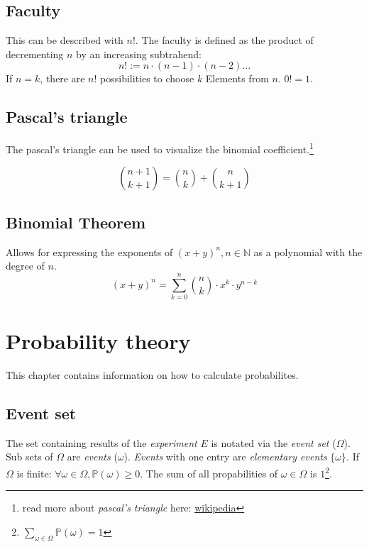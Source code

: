 \documentclass[twoside, a4paper, twocolumn]{article}
\begin{document}
    \subsection{Faculty}
    This can be described with $n!$. The faculty is defined as the
    product of decrementing $n$ by an increasing subtrahend:
    \begin{equation}
        n! := n \cdot (n-1) \cdot (n-2) \textrm{...}
    \end{equation}
    If $n = k$, there are $n!$ possibilities to choose $k$ Elements from $n$.
    $0! = 1$.

    \subsection{Pascal's triangle}
    The pascal's triangle can be used to visualize the binomial
    coefficient.\footnote{read more about \textit{pascal's triangle}
    here: \href{https://en.wikipedia.org/wiki/Pascal's_triangle}{wikipedia}}

    \begin{equation}
        \binom{n+1}{k+1} = \binom{n}{k} + \binom{n}{k+1}
    \end{equation}

    \subsection{Binomial Theorem}
    Allows for expressing the exponents of $(x+y)^n, n \in \mathbb{N}$ as a
    polynomial with the degree of $n$.
    \begin{equation}
        (x+y)^n = \sum^n_{k=0} \binom{n}{k} \cdot x^k \cdot y^{n-k}
    \end{equation}

    \section{Probability theory}
    This chapter contains information on how to calculate probabilites.

    \subsection{Event set} The set containing results of the
    \textit{experiment} $E$ is notated via the \textit{event set} ($\Omega$).
    Sub sets of $\Omega$ are \textit{events} ($\omega$). \textit{Events} with
    one entry are \textit{elementary events} $\{\omega\}$. If $\Omega$ is
    finite: $\forall \omega \in \Omega,\mathbb{P}(\omega) \geq 0$. The sum of
    all propabilities of $\omega \in \Omega$ is $1$\footnote{$\sum_{\omega \in
    \Omega} \mathbb{P}(\omega) = 1$}.
\end{document}
